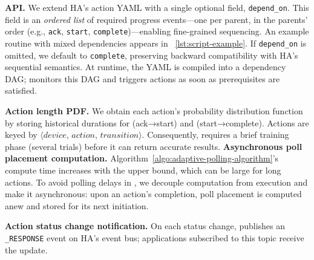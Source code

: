 \noindent \textbf{\abs{} API.}
We extend HA’s action YAML with a single optional field, \texttt{depend\_on}. 
This field is an \emph{ordered list} of required progress events---one per parent, in the parents’ order (e.g., \texttt{ack}, \texttt{start}, \texttt{complete})---enabling fine-grained sequencing.
An example routine with mixed dependencies appears in \Figure~\ref{lst:script-example}.
If \texttt{depend\_on} is omitted, we default to \texttt{complete}, preserving backward compatibility with HA’s sequential semantics.
At runtime, the YAML is compiled into a dependency DAG; \scheduler{} monitors this DAG and triggers actions as soon as prerequisites are satisfied.

\noindent \textbf{Action length PDF.} 
We obtain each action's probability distribution function by storing historical durations for (ack→start) and (start→complete).
Actions are keyed by \(\langle\textit{device},\,\textit{action},\,\textit{transition}\rangle\). 
Consequently, \dynpoller{} requires a brief training phase (several trials) before it can return accurate results.
{
\noindent \textbf{Asynchronous poll placement computation.}
Algorithm~\ref{algo:adaptive-polling-algorithm}'s compute time increases with the upper bound, which can be large for long actions. 
To avoid polling delays
in \sysname, we decouple computation from execution and make it asynchronous: upon an action's completion, poll placement is computed anew and stored for its next initiation. 
}

\noindent \textbf{Action status change notification.}
On each status change, \sysname{} publishes an \texttt{\abs\_RESPONSE} event on HA’s event bus; applications subscribed to this topic receive the update.
